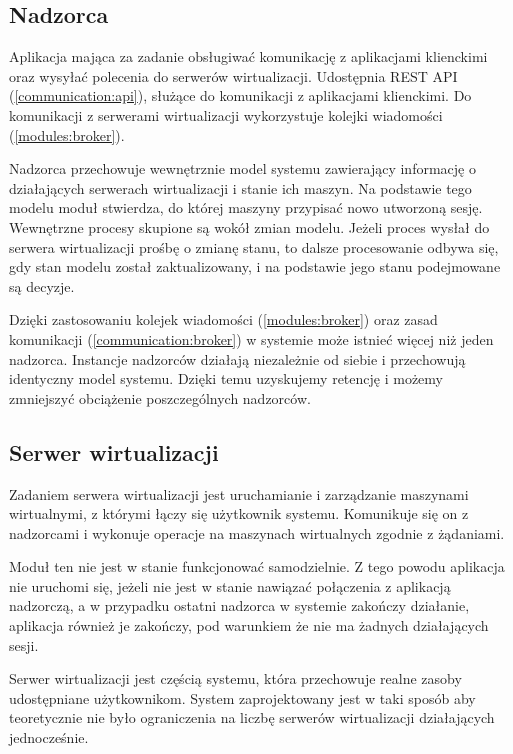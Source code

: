 \documentclass[../opis-rozwiazania.tex]{subfiles}
\begin{document}
\subsection{Nadzorca}
\label{modules:overseer}

Aplikacja mająca za zadanie obsługiwać komunikację z aplikacjami klienckimi oraz wysyłać polecenia do serwerów wirtualizacji. Udostępnia REST API (\ref{communication:api}), służące do komunikacji z aplikacjami klienckimi. Do komunikacji z serwerami wirtualizacji wykorzystuje kolejki wiadomości (\ref{modules:broker}).

Nadzorca przechowuje wewnętrznie model systemu zawierający informację o działających serwerach wirtualizacji i stanie ich maszyn. Na podstawie tego modelu moduł stwierdza, do której maszyny przypisać nowo utworzoną sesję. Wewnętrzne procesy skupione są wokół zmian modelu. Jeżeli proces wysłał do serwera wirtualizacji prośbę o zmianę stanu, to dalsze procesowanie odbywa się, gdy stan modelu został zaktualizowany, i na podstawie jego stanu podejmowane są decyzje.

Dzięki zastosowaniu kolejek wiadomości (\ref{modules:broker}) oraz zasad komunikacji (\ref{communication:broker}) w systemie może istnieć więcej niż jeden nadzorca. Instancje nadzorców działają niezależnie od siebie i przechowują identyczny model systemu. Dzięki temu uzyskujemy retencję i możemy zmniejszyć obciążenie poszczególnych nadzorców.

\subsection{Serwer wirtualizacji}
\label{modules:virtsrv}

Zadaniem serwera wirtualizacji jest uruchamianie i zarządzanie maszynami wirtualnymi, z którymi łączy się użytkownik systemu. Komunikuje się on z nadzorcami i wykonuje operacje na maszynach wirtualnych zgodnie z żądaniami.

Moduł ten nie jest w stanie funkcjonować samodzielnie. Z tego powodu aplikacja nie uruchomi się, jeżeli nie jest w stanie nawiązać połączenia z aplikacją nadzorczą, a w przypadku ostatni nadzorca w systemie zakończy działanie, aplikacja również je zakończy, pod warunkiem że nie ma żadnych działających sesji.

Serwer wirtualizacji jest częścią systemu, która przechowuje realne zasoby udostępniane użytkownikom.
System zaprojektowany jest w taki sposób aby teoretycznie nie było ograniczenia na liczbę serwerów wirtualizacji działających jednocześnie.
\end{document}
